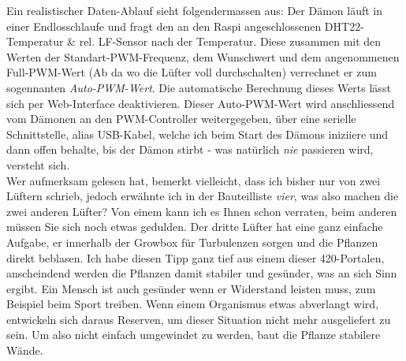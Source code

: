 \documentclass[12pt,titlepage,a4paper]{article}
\begin{document}
Ein realistischer Daten-Ablauf sieht folgendermassen aus: Der Dämon läuft in einer Endlosschlaufe und fragt den an den Raspi angeschlossenen DHT22-Temperatur \& rel. LF-Sensor nach der Temperatur. Diese zusammen mit den Werten der Standart-PWM-Frequenz, dem Wunschwert und dem angenommenen Full-PWM-Wert (Ab da wo die Lüfter voll durchschalten) verrechnet er zum sogennanten \textit{Auto-PWM-Wert}. Die automatische Berechnung dieses Werts lässt sich per Web-Interface deaktivieren. Dieser Auto-PWM-Wert wird anschliessend vom Dämonen an den PWM-Controller weitergegeben, über eine serielle Schnittstelle, alias USB-Kabel, welche ich beim Start des Dämons iniziiere und dann offen behalte, bis der Dämon stirbt - was natürlich \textit{nie} passieren wird, versteht sich.\\
Wer aufmerksam gelesen hat, bemerkt vielleicht, dass ich bisher nur von zwei Lüftern schrieb, jedoch erwähnte ich in der Bauteilliste \textit{vier}, was also machen die zwei anderen Lüfter? Von einem kann ich es Ihnen schon verraten, beim anderen müssen Sie sich noch etwas gedulden. Der dritte Lüfter hat eine ganz einfache Aufgabe, er innerhalb der Growbox für Turbulenzen sorgen und die Pflanzen direkt beblasen. Ich habe diesen Tipp ganz tief aus einem dieser 420-Portalen, anscheindend werden die Pflanzen damit stabiler und gesünder, was an sich Sinn ergibt. Ein Mensch ist auch gesünder wenn er Widerstand leisten muss, zum Beispiel beim Sport treiben. Wenn einem Organismus etwas abverlangt wird, entwickeln sich daraus Reserven, um dieser Situation nicht mehr ausgeliefert zu sein. Um also nicht einfach umgewindet zu werden, baut die Pflanze stabilere Wände.
\end{document}
